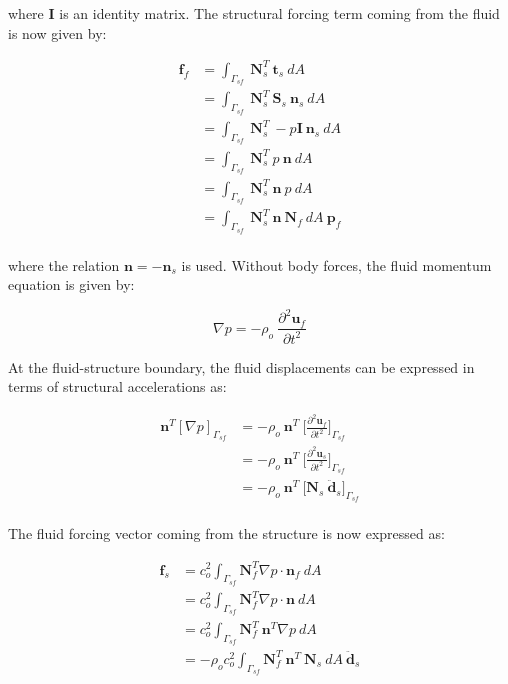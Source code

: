 \documentclass[3p]{elsarticle}
\begin{document}
\noindent where $\mathbf{I}$ is an identity matrix. The structural forcing term coming from the fluid is now given by:

\begin{equation}
\label{eqn:Int_3}
    \begin{aligned}
    \mathbf{f}_f &= \int_{\Gamma_{sf}}~\mathbf{N}_s^T~\mathbf{t}_s~dA\\
    &= \int_{\Gamma_{sf}}~\mathbf{N}_s^T~\mathbf{S}_s~\mathbf{n}_s~dA\\
    &= \int_{\Gamma_{sf}}~\mathbf{N}_s^T~-p\mathbf{I}~\mathbf{n}_s~dA\\
    &= \int_{\Gamma_{sf}}~\mathbf{N}_s^T~p~\mathbf{n}~dA\\
    &= \int_{\Gamma_{sf}}~\mathbf{N}_s^T~\mathbf{n}~p~dA\\
    &= \int_{\Gamma_{sf}}~\mathbf{N}_s^T~\mathbf{n}~\mathbf{N}_f~dA~\mathbf{p}_f\\
    \end{aligned}
\end{equation}

\noindent where the relation $\mathbf{n} = -\mathbf{n}_s$ is used. Without body forces, the fluid momentum equation is given by:

\begin{equation}
\label{eqn:Int_4}
    \nabla p = -\rho_o~\frac{\partial^2\mathbf{u}_f}{\partial t^2}
\end{equation}

\noindent At the fluid-structure boundary, the fluid displacements can be expressed in terms of structural accelerations as:

\begin{equation}
\label{eqn:Int_4}
\begin{aligned}
    \mathbf{n}^T[\nabla p]_{\Gamma_{sf}} &= -\rho_o~\mathbf{n}^T~\big[\frac{\partial^2\mathbf{u}_f}{\partial t^2}\big]_{\Gamma_{sf}}\\
    &= -\rho_o~\mathbf{n}^T~\big[\frac{\partial^2\mathbf{u}_s}{\partial t^2}\big]_{\Gamma_{sf}}\\
    &= -\rho_o~\mathbf{n}^T~\big[\mathbf{N}_s~\ddot{\mathbf{d}}_s\Big]_{\Gamma_{sf}}\\
    \end{aligned}
\end{equation}

\noindent The fluid forcing vector coming from the structure is now expressed as:

\begin{equation}
    \label{eqn:Int_5}
    \begin{aligned}
    \mathbf{f}_s &= c_o^2 \int_{\Gamma_{sf}} \mathbf{N}_f^T \nabla p \cdot \mathbf{n}_f~dA\\
    &= c_o^2 \int_{\Gamma_{sf}} \mathbf{N}_f^T \nabla p \cdot \mathbf{n}~dA\\
    &= c_o^2 \int_{\Gamma_{sf}} \mathbf{N}_f^T~\mathbf{n}^T\nabla p~dA\\
    &= -\rho_oc_o^2 \int_{\Gamma_{sf}} \mathbf{N}_f^T~\mathbf{n}^T~\mathbf{N}_s~dA~\ddot{\mathbf{d}}_s\\
    \end{aligned}
\end{equation}
\end{document}
